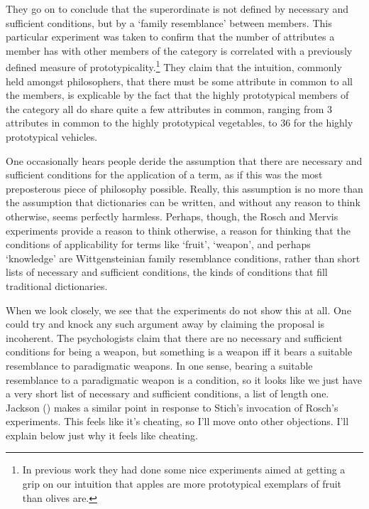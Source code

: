 \documentclass[
  10pt,
  letterpaper,
  DIV=11,
  numbers=noendperiod,
  twoside]{scrartcl}
\begin{document}
They go on to conclude that the superordinate is not defined by
necessary and sufficient conditions, but by a `family resemblance'
between members. This particular experiment was taken to confirm that
the number of attributes a member has with other members of the category
is correlated with a previously defined measure of
prototypicality.\footnote{In previous work they had done some nice
  experiments aimed at getting a grip on our intuition that apples are
  more prototypical exemplars of fruit than olives are.} They claim that
the intuition, commonly held amongst philosophers, that there must be
some attribute in common to all the members, is explicable by the fact
that the highly prototypical members of the category all do share quite
a few attributes in common, ranging from 3 attributes in common to the
highly prototypical vegetables, to 36 for the highly prototypical
vehicles.

One occasionally hears people deride the assumption that there are
necessary and sufficient conditions for the application of a term, as if
this was the most preposterous piece of philosophy possible. Really,
this assumption is no more than the assumption that dictionaries can be
written, and without any reason to think otherwise, seems perfectly
harmless. Perhaps, though, the Rosch and Mervis experiments provide a
reason to think otherwise, a reason for thinking that the conditions of
applicability for terms like `fruit', `weapon', and perhaps `knowledge'
are Wittgensteinian family resemblance conditions, rather than short
lists of necessary and sufficient conditions, the kinds of conditions
that fill traditional dictionaries.

When we look closely, we see that the experiments do not show this at
all. One could try and knock any such argument away by claiming the
proposal is incoherent. The psychologists claim that there are no
necessary and sufficient conditions for being a weapon, but something is
a weapon iff it bears a suitable resemblance to paradigmatic weapons. In
one sense, bearing a suitable resemblance to a paradigmatic weapon is a
condition, so it looks like we just have a very short list of necessary
and sufficient conditions, a list of length one. Jackson
() makes a similar point in response
to Stich's invocation of Rosch's experiments. This feels like it's
cheating, so I'll move onto other objections. I'll explain below just
why it feels like cheating.
\end{document}

